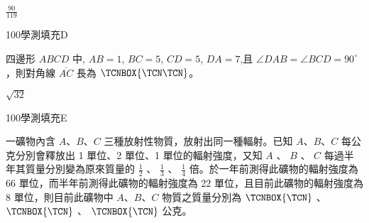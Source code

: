 \begin{QUESTIONS}
\begin{QUESTION}
        \begin{QANS}
            $\frac{90}{119}$
        \end{QANS}
        \begin{QSOLLIST}
        \end{QSOLLIST}
        \begin{QEMPTYSPACE}
        \end{QEMPTYSPACE}
    \end{QUESTION}
    \begin{QUESTION}
        \begin{ExamInfo}{100}{學測}{填充}{D}
        \end{ExamInfo}
        \begin{ExamAnsRateInfo}{32}{73}{21}{2}
        \end{ExamAnsRateInfo}
        \begin{QBODY}
            四邊形 $ABCD$ 中, $AB=1$, $BC=5$, $CD=5$, $DA=7$,且 $\angle DAB= \angle BCD=90^\circ$，則對角線 $\overline{AC}$ 長為 $\TCNBOX{\TCN\TCN}$。
        \end{QBODY}
        \begin{QFROMS}
        \end{QFROMS}
        \begin{QTAGS}\end{QTAGS}
        \begin{QANS}
            $\sqrt{32}$
        \end{QANS}
        \begin{QSOLLIST}
        \end{QSOLLIST}
        \begin{QEMPTYSPACE}
        \end{QEMPTYSPACE}
    \end{QUESTION}
    \begin{QUESTION}
        \begin{ExamInfo}{100}{學測}{填充}{E}
        \end{ExamInfo}
        \begin{ExamAnsRateInfo}{26}{59}{17}{2}
        \end{ExamAnsRateInfo}
        \begin{QBODY}
            一礦物內含 $A$、$B$、$C$ 三種放射性物質，放射出同一種輻射。已知 $A$、$B$、$C$ 每公克分別會釋放出 1 單位、2 單位、1 單位的輻射強度，又知 $A$ 、 $B$ 、 $C$ 每過半年其質量分別變為原來質量的  $\frac{1}{2}$ 、 $\frac{1}{3}$ 、 $\frac{1}{4}$ 倍。於一年前測得此礦物的輻射強度為 66 單位，而半年前測得此礦物的輻射強度為 22 單位，且目前此礦物的輻射強度為 8 單位，則目前此礦物中 $A$、$B$、$C$ 物質之質量分別為 $\TCNBOX{\TCN}$ 、 $\TCNBOX{\TCN}$ 、 $\TCNBOX{\TCN}$ 公克。

\end{QBODY}
\end{QUESTION}
\end{QUESTIONS}

